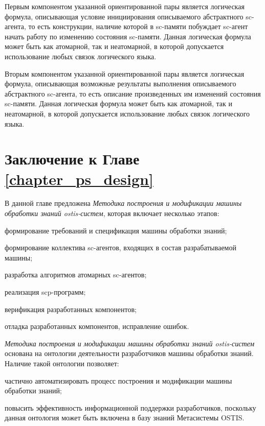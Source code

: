 \begin{SCn}
\begin{scnindent}
{    Первым компонентом указанной ориентированной пары является логическая формула, описывающая условие инициирования описываемого абстрактного sc-агента, то есть конструкции, наличие которой в sc-памяти побуждает sc-агент начать работу по изменению состояния sc-памяти. Данная логическая формула может быть как атомарной, так и неатомарной, в которой допускается использование любых связок логического языка.
    
    Вторым компонентом указанной ориентированной пары является логическая формула, описывающая возможные результаты выполнения описываемого абстрактного sc-агента, то есть описание произведенных им изменений состояния sc-памяти. Данная логическая формула может быть как атомарной, так и неатомарной, в которой допускается использование любых связок логического языка.}
\end{scnindent}
\end{SCn}

\section*{Заключение к Главе \ref{chapter_ps_design}}

В данной главе предложена \textit{Методика построения и модификации машины обработки знаний ostis-систем}, которая включает несколько этапов:
\begin{textitemize}
    \item формирование требований и спецификация машины обработки знаний;
    \item формирование коллектива sc-агентов, входящих в состав разрабатываемой машины;
    \item разработка алгоритмов атомарных sc-агентов;
    \item реализация scp-программ;
    \item верификация разработанных компонентов;
    \item отладка разработанных компонентов, исправление ошибок.
\end{textitemize}

\textit{Методика построения и модификации машины обработки знаний ostis-систем} основана на онтологии деятельности разработчиков машины обработки знаний. Наличие такой онтологии позволяет:
\begin{textitemize}
    \item частично автоматизировать процесс построения и модификации машины обработки знаний;
    \item повысить эффективность информационной поддержки разработчиков, поскольку данная онтология может быть включена в базу знаний Метасистемы OSTIS.
\end{textitemize}

